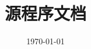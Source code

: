 \documentclass[
class = book,
zihao = -4,
font = noto,
paper = a4paper,
openany
]{easybook}
\begin{document}
	\title{\sffamily \Name\ \Version \\ 源程序文档}
	\date{\today}
	
	\frontmatter[roman]
	\maketitle
	
	\mainmatter*

	\newpage
	
	
	\backmatter
\end{document}
